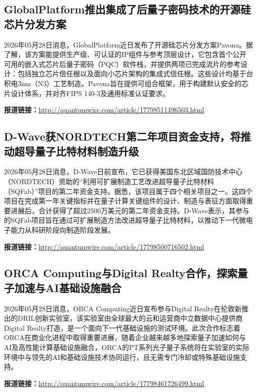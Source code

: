 \documentclass[12pt,a4paper]{ctexart}
\begin{document}
\subsection{ GlobalPlatform推出集成了后量子密码技术的开源硅芯片分发方案 }

2026年05月28日消息，GlobalPlatform近日发布了开源硅芯片分发方案Pavona。据了解，该方案能提供生产级、可认证的IP组件与参考顶层设计，它包含首个公开可用的嵌入式芯片后量子密码（PQC）软件栈，并提供两项已完成流片的参考设计：包括独立芯片信任根以及面向小芯片架构的集成式信任根。这些设计均基于台积电3nm（N3）工艺制造。Pavona旨在提供可组合框架，用于构建默认安全的芯片设计体系，并对齐FIPS 140-3及通用标准认证要求。

\noindent\textbf{报道链接：}\url{http://quantumwire.com/article/17798511496503.html}

\subsection{ D-Wave获NORDTECH第二年项目资金支持，将推动超导量子比特材料制造升级 }

2026年05月28日消息，D-Wave日前宣布，它已获得美国东北区域国防技术中心（NORDTECH）资助的“利用可扩展制造工艺改进超导量子比特材料（SQFab）”项目的第二年资金支持。据悉，该项目属于四个相关项目之一。这四个项目在完成第一年关键指标并在量子计算关键组件的设计、制造与表征方面取得重要进展后，合计获得了超过2500万美元的第二年资金支持。D-Wave表示，其参与的SQFab项目旨在通过可扩展制造方法改进超导量子比特材料，以推动下一代微电子能力从科研阶段向制造阶段发展。

\noindent\textbf{报道链接：}\url{http://quantumwire.com/article/17798500716502.html}

\subsection{ ORCA Computing与Digital Realty合作，探索量子加速与AI基础设施融合 }

2026年05月28日消息，ORCA Computing近日宣布参与Digital Realty在伦敦新推出的DRIL创新实验室，该实验室由全球最大的云和运营商中立数据中心提供商Digital Realty打造，是一个面向下一代基础设施的测试环境。此次合作标志着ORCA在商业化进程中取得重要进展，随着企业越来越多地探索量子加速如何与AI及高性能计算基础设施融合，ORCA的PT系列光子量子系统将在实验室的实际环境中与领先的AI和基础设施技术协同运行，且无需专门冷却或特殊基础设施支持。

\noindent\textbf{报道链接：}\url{http://quantumwire.com/article/17798461726499.html}
\end{document}
